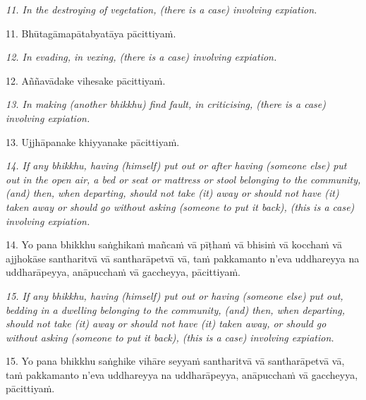 \documentclass[11pt]{article}
\begin{document}
\begin{paracol}{2}
\begin{column}
{\itshape\footnotesize
11. In the destroying of vegetation, (there is a case) involving expiation.
}
\switchcolumn

\begin{flushleft}
11. Bhūtagāmapātabyatāya pācittiyaṁ.
\switchcolumn*
\end{flushleft}

{\itshape\footnotesize
12. In evading, in vexing, (there is a case) involving expiation.
}
\switchcolumn

\begin{flushleft}
12. Aññavādake vihesake pācittiyaṁ.
\switchcolumn*
\end{flushleft}

{\itshape\footnotesize
13. In making (another bhikkhu) find fault, in criticising, (there is a case) involving expiation.
}
\switchcolumn

\begin{flushleft}
13. Ujjhāpanake khiyyanake pācittiyaṁ.
\switchcolumn*
\end{flushleft}

{\itshape\footnotesize
14. If any bhikkhu, having (himself) put out or after having (someone else) put out in the open air, a bed or seat or mattress or stool belonging to the community, (and) then, when departing, should not take (it) away or should not have (it) taken away or should go without asking (someone to put it back), (this is a case) involving expiation.
}
\switchcolumn

\begin{flushleft}
14. Yo pana bhikkhu saṅghikaṁ mañcaṁ vā pīṭhaṁ vā bhisiṁ vā kocchaṁ vā ajjhokāse santharitvā vā santharāpetvā vā, taṁ pakkamanto n’eva uddhareyya na uddharāpeyya, anāpucchaṁ vā gaccheyya, pācittiyaṁ.
\switchcolumn*
\end{flushleft}

{\itshape\footnotesize
15. If any bhikkhu, having (himself) put out or having (someone else) put out, bedding in a dwelling belonging to the community, (and) then, when departing, should not take (it) away or should not have (it) taken away, or should go without asking (someone to put it back), (this is a case) involving expiation.
}
\switchcolumn

\begin{flushleft}
15. Yo pana bhikkhu saṅghike vihāre seyyaṁ santharitvā vā santharāpetvā vā, taṁ pakkamanto n’eva uddhareyya na uddharāpeyya, anāpucchaṁ vā gaccheyya, pācittiyaṁ.
\switchcolumn*
\end{flushleft}


\end{column}
\end{paracol}
\end{document}
